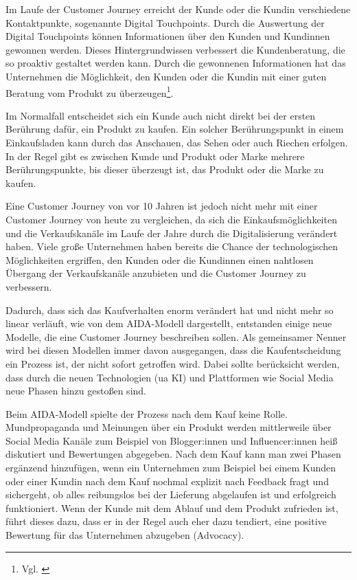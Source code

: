 Im Laufe der Customer Journey erreicht der Kunde oder die Kundin verschiedene Kontaktpunkte, sogenannte Digital Touchpoints. Durch die Auswertung der Digital Touchpoints können Informationen über den Kunden und Kundinnen gewonnen werden. Dieses Hintergrundwissen verbessert die Kundenberatung, die so proaktiv gestaltet werden kann. Durch die gewonnenen Informationen hat das Unternehmen die Möglichkeit, den Kunden oder die Kundin mit einer guten Beratung vom Produkt zu überzeugen\footnote{Vgl. \autocite [Online] {Duehning2021}}.
\newline

Im Normalfall entscheidet sich ein Kunde auch nicht direkt bei der ersten Berührung dafür, ein Produkt zu kaufen. Ein solcher Berührungspunkt in einem Einkaufsladen kann durch das Anschauen, das Sehen oder auch Riechen erfolgen. In der Regel gibt es zwischen Kunde und Produkt oder Marke mehrere Berührungspunkte, bis dieser überzeugt ist, das Produkt oder die Marke zu kaufen.
\newline

Eine Customer Journey von vor 10 Jahren ist jedoch nicht mehr mit einer Customer Journey von heute zu vergleichen, da sich die Einkaufsmöglichkeiten und die Verkaufskanäle im Laufe der Jahre durch die Digitalisierung verändert haben. Viele große Unternehmen haben bereits die Chance der technologischen Möglichkeiten ergriffen, den Kunden oder die Kundinnen einen nahtlosen Übergang der Verkaufskanäle anzubieten und die Customer Journey zu verbessern.
\newline

Dadurch, dass sich das Kaufverhalten enorm verändert hat und nicht mehr so linear verläuft, wie von dem AIDA-Modell dargestellt, entstanden einige neue Modelle, die eine Customer Journey beschreiben sollen. Als gemeinsamer Nenner wird bei diesen Modellen immer davon ausgegangen, dass die Kaufentscheidung ein Prozess ist, der nicht sofort getroffen wird. Dabei sollte berücksicht werden, dass durch die neuen Technologien (\ac{ua} KI) und Plattformen wie Social Media neue Phasen hinzu gestoßen sind.
\newline

Beim AIDA-Modell spielte der Prozess nach dem Kauf keine Rolle. Mundpropaganda und Meinungen über ein Produkt werden mittlerweile über Social Media Kanäle zum Beispiel von Blogger:innen und Influencer:innen heiß diskutiert und Bewertungen abgegeben.	 Nach dem Kauf kann man zwei Phasen ergänzend hinzufügen, wenn ein Unternehmen zum Beispiel bei einem Kunden oder einer Kundin nach dem Kauf nochmal explizit nach Feedback fragt und sichergeht, ob alles reibungslos bei der Lieferung abgelaufen ist und erfolgreich funktioniert. Wenn der Kunde mit dem Ablauf und dem Produkt zufrieden ist, führt dieses dazu, dass er in der Regel auch eher dazu tendiert, eine positive Bewertung für das Unternehmen abzugeben (Advocacy).
\newline

